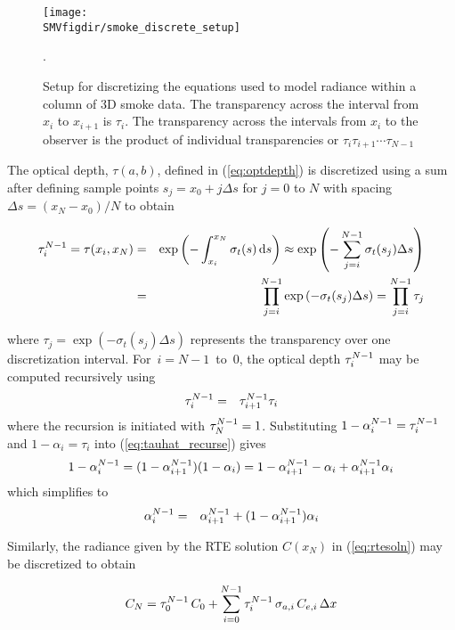 \documentclass[11pt]{article}
\newcommand{\SMVfigdir}{../../../fig/smv/figures}
\begin{document}
\begin{figure}[bph]
\begin{center}
\texttt{[image: \\SMVfigdir/smoke\_discrete\_setup]}
\end{center}
\caption{Setup for discretizing
the equations used to model radiance within a column of 3D smoke
data. The transparency across the interval from $x_i$ to $x_{i+1}$
is $\tau_i$. The transparency across the intervals from $x_i$ to
the observer is the product of individual transparencies or
$\tau_i\tau_{i+1}\cdots\tau_{N-1}$}.
\label{fig:smokediscretesetup}
\end{figure}

The optical depth, $\tau(a,b)$, defined in (\ref{eq:optdepth}) is
discretized using a sum  after defining sample points
$s_j=x_0+j\Delta s$ for $j=0$ to $N$ with spacing $\Delta
s=(x_N-x_0)/N$ to obtain

\begin{eqnarray}
\tau_{i}^{N-1}=\tau(x_i,x_N)&=&\exp\left(-\int_{x_i}^{x_N}\sigma_t(s)\,\mbox{d}s\right)\approx\exp\left(-\sum_{j=i}^{N-1}\sigma_t(s_j)\Delta s\right)\\
&=&\prod_{j=i}^{N-1}\exp\left(-\sigma_t(s_j)\Delta s\right)=\prod_{j=i}^{N-1}\tau_j
\end{eqnarray}

\noindent where $\tau_j=\exp\left(-\sigma_t(s_j)\Delta s\right)$
represents the transparency over one discretization interval.
For~$i=N-1$~to~$0$, the optical depth $\tau_{i}^{N-1}$ may be computed
recursively using
\begin{eqnarray}
\label{eq:tauhat_recurse}
\tau_{i}^{N-1}&=&\tau_{i+1}^{N-1}\tau_i
\end{eqnarray}
\noindent where the recursion is initiated with $\tau_{N}^{N-1}=1$.
Substituting $1-\alpha_{i}^{N-1}=\tau_{i}^{N-1}$ and $1-\alpha_i=\tau_i$ into
(\ref{eq:tauhat_recurse}) gives
\begin{eqnarray}
1-\alpha_{i}^{N-1}=(1-\alpha_{i+1}^{N-1})(1-\alpha_i)=1-\alpha_{i+1}^{N-1} - \alpha_i + \alpha_{i+1}^{N-1}\alpha_i
\end{eqnarray}
which simplifies to
\begin{eqnarray}
\label{eq:alpha2}
\alpha_{i}^{N-1}&=&\alpha_{i+1}^{N-1} + (1-\alpha_{i+1}^{N-1})\alpha_i
\end{eqnarray}

Similarly, the radiance given by the RTE solution $C(x_N)$ in
(\ref{eq:rtesoln}) may be discretized to obtain

\begin{equation}
C_{N} = \tau_{0}^{N-1}\,C_0 +
\sum_{i=0}^{N-1}\tau_{i}^{N-1}\,\sigma_{a,i}\,C_{e,i}\,\Delta x
\label{eq:discrete_rte2}
\end{equation}
\end{document}
